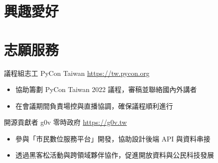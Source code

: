 \documentclass[a4paper, serif, 10pt]{moderncv}
\begin{document}
\section{興趣愛好}

\section{志願服務}

        {議程組志工}
        {PyCon Taiwan}
        {\url{https://tw.pycon.org}}
        {}
        {\begin{itemize}
\item 協助籌劃 PyCon Taiwan 2022 議程，審稿並聯絡國內外講者
\item 在會議期間負責場控與直播協調，確保議程順利進行
\end{itemize}}
    

        {開源貢獻者}
        {g0v 零時政府}
        {\url{https://g0v.tw}}
        {}
        {\begin{itemize}
\item 參與「市民數位服務平台」開發，協助設計後端 API 與資料串接
\item 透過黑客松活動與跨領域夥伴協作，促進開放資料與公民科技發展
\end{itemize}}
    
\end{document}
